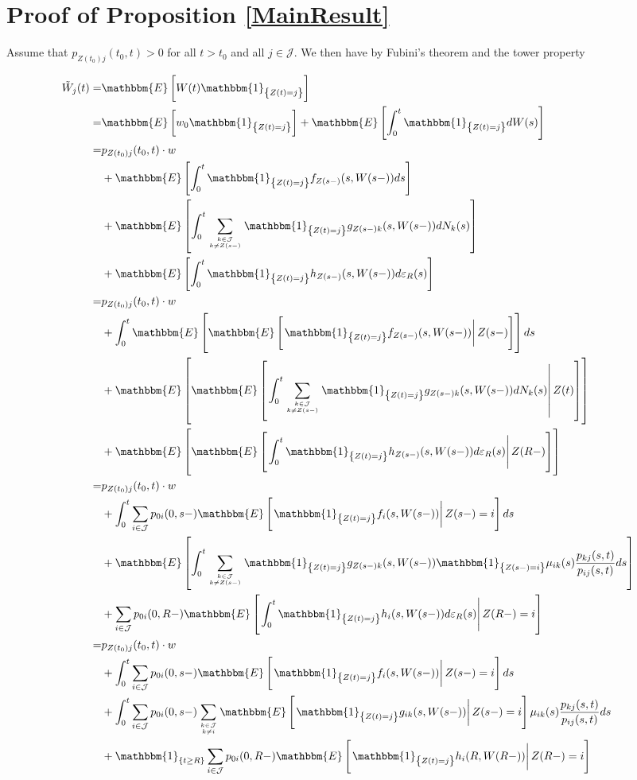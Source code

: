 \documentclass{book}
\newcommand{\1}[1]{\mathbbm{1}_{\left\lbrace #1 \right\rbrace}}
\newcommand{\expec}[1][def]{\mathbbm{E} \left[ #1 \right]}
\newcommand{\econd}[2][def]{\mathbbm{E} \left[ \left. #1 \right| #2 \right]}
\theoremstyle{break}
\theoremstyle{remark}
\numberwithin{equation}{section}
\begin{document}
\section{Proof of Proposition \ref{MainResult}} \label{MainProof}

Assume that $p_{Z(t_0)j}(t_0,t)>0$ for all $t>t_0$ and all $j \in \mathcal{J}$. We then have by Fubini's theorem and the tower property

\begin{align*}
    \tilde{W}_j(t) =& \expec[W(t) \1{Z(t)=j}] \\
    =& \expec[w_0 \1{Z(t)=j}] + \expec[\int_0^t \1{Z(t)=j} dW(s)] \\
    =& p_{Z(t_0)j}(t_0,t) \cdot w \\
    &+ \expec[\int_0^t \1{Z(t)=j} f_{Z(s-)}(s,W(s-)) ds] \\
    &+ \expec[\int_0^t \sum_{k \in \mathcal{J} \atop k \neq Z(s-)} \1{Z(t)=j} g_{Z(s-)k}(s,W(s-)) dN_k(s)] \\
    &+ \expec[\int_0^t \1{Z(t)=j} h_{Z(s-)}(s,W(s-)) d \varepsilon_{R}(s)] \\
    =& p_{Z(t_0)j}(t_0,t) \cdot w \\
    &+ \int_0^t \mathbbm{E} \left[ \econd[\1{Z(t)=j} f_{Z(s-)}(s,W(s-))]{Z(s-)} \right] ds \\
    &+ \mathbbm{E} \left[ \econd[ \int_0^t \sum_{k \in \mathcal{J} \atop k \neq Z(s-)} \1{Z(t)=j} g_{Z(s-)k}(s,W(s-)) dN_k(s)]{Z(t)} \right] \\
    &+ \mathbbm{E} \left[ \econd[\int_0^t \1{Z(t)=j} h_{Z(s-)}(s,W(s-)) d \varepsilon_{R}(s)]{Z(R-)} \right] \\
    =& p_{Z(t_0)j}(t_0,t) \cdot w \\
    &+ \int_0^t \sum_{i \in \mathcal{J}} p_{0i}(0,s-) \econd[\1{Z(t)=j} f_{i}(s,W(s-))]{Z(s-)=i} ds \\
    &+ \expec[ \int_0^t \sum_{k \in \mathcal{J} \atop k \neq Z(s-)} \1{Z(t)=j} g_{Z(s-)k}(s,W(s-)) \1{Z(s-)=i} \mu_{ik}(s) \frac{p_{kj}(s,t)}{p_{ij}(s,t)} ds] \\
    &+ \sum_{i \in \mathcal{J}} p_{0i}(0,R-) \econd[\int_0^t \1{Z(t)=j} h_{i}(s,W(s-)) d \varepsilon_{R}(s)]{Z(R-)=i} \\
    =& p_{Z(t_0)j}(t_0,t) \cdot w \\
    &+ \int_0^t \sum_{i \in \mathcal{J}} p_{0i}(0,s-) \econd[\1{Z(t)=j} f_{i}(s,W(s-))]{Z(s-)=i} ds \\
    &+ \int_0^t \sum_{i \in \mathcal{J}} p_{0i}(0,s-) \sum_{k \in \mathcal{J} \atop k \neq i} \econd[\1{Z(t)=j} g_{ik}(s,W(s-))]{Z(s-)=i} \mu_{ik}(s) \frac{p_{kj}(s,t)}{p_{ij}(s,t)} ds \\
    &+ \1{t \geq R} \sum_{i \in \mathcal{J}} p_{0i}(0,R-) \econd[\1{Z(t)=j} h_{i}(R,W(R-))]{Z(R-)=i} \\
\end{align*}
\end{document}

